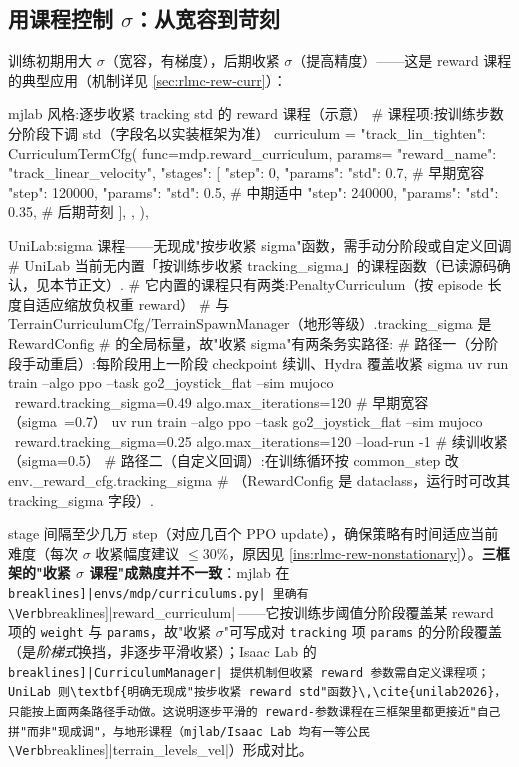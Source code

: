 \subsection{\texorpdfstring{用课程控制 $\sigma$：从宽容到苛刻}{用课程控制 sigma：从宽容到苛刻}}
\label{sec:rlmc-rew-sigmacurr}

训练初期用大 $\sigma$（宽容，有梯度），后期收紧 $\sigma$（提高精度）——这是 reward 课程的典型应用（机制详见 \cref{sec:rlmc-rew-curr}）：

\begin{codebox}[Python]{mjlab 风格:逐步收紧 tracking std 的 reward 课程（示意）}
# 课程项:按训练步数分阶段下调 std（字段名以实装框架为准）
curriculum = {
    "track_lin_tighten": CurriculumTermCfg(
        func=mdp.reward_curriculum,
        params={
            "reward_name": "track_linear_velocity",
            "stages": [
                {"step": 0,      "params": {"std": 0.7}},   # 早期宽容
                {"step": 120000, "params": {"std": 0.5}},   # 中期适中
                {"step": 240000, "params": {"std": 0.35}},  # 后期苛刻
            ],
        },
    ),
}
\end{codebox}

\begin{codebox}[Python]{UniLab:sigma 课程——无现成"按步收紧 sigma"函数，需手动分阶段或自定义回调}
# UniLab 当前无内置「按训练步收紧 tracking_sigma」的课程函数（已读源码确认，见本节正文）.
# 它内置的课程只有两类:PenaltyCurriculum（按 episode 长度自适应缩放负权重 reward）
#   与 TerrainCurriculumCfg/TerrainSpawnManager（地形等级）.tracking_sigma 是 RewardConfig
#   的全局标量，故"收紧 sigma"有两条务实路径:
# 路径一（分阶段手动重启）:每阶段用上一阶段 checkpoint 续训、Hydra 覆盖收紧 sigma
uv run train --algo ppo --task go2_joystick_flat --sim mujoco \
    reward.tracking_sigma=0.49 algo.max_iterations=120   # 早期宽容（sigma~=0.7）
uv run train --algo ppo --task go2_joystick_flat --sim mujoco \
    reward.tracking_sigma=0.25 algo.max_iterations=120 --load-run -1   # 续训收紧（sigma=0.5）
# 路径二（自定义回调）:在训练循环按 common_step 改 env._reward_cfg.tracking_sigma
#   （RewardConfig 是 dataclass，运行时可改其 tracking_sigma 字段）.
\end{codebox}

stage 间隔至少几万 step（对应几百个 PPO update），确保策略有时间适应当前难度（每次 $\sigma$ 收紧幅度建议 $\le30\%$，原因见 \cref{ins:rlmc-rew-nonstationary}）。\textbf{三框架的"收紧 $\sigma$ 课程"成熟度并不一致}：mjlab 在 \Verb[breaklines]|envs/mdp/curriculums.py| 里确有 \Verb[breaklines]|reward_curriculum|\,\cite{mjlab2026}——它按训练步阈值分阶段覆盖某 reward 项的 \verb|weight| 与 \verb|params|，故"收紧 $\sigma$"可写成对 \verb|tracking| 项 \verb|params| 的分阶段覆盖（是\emph{阶梯式}换挡，非逐步平滑收紧）；Isaac Lab 的 \Verb[breaklines]|CurriculumManager| 提供机制但收紧 reward 参数需自定义课程项；UniLab 则\textbf{明确无现成"按步收紧 reward std"函数}\,\cite{unilab2026}，只能按上面两条路径手动做。这说明逐步平滑的 reward-参数课程在三框架里都更接近"自己拼"而非"现成调"，与地形课程（mjlab/Isaac Lab 均有一等公民 \Verb[breaklines]|terrain_levels_vel|）形成对比。

